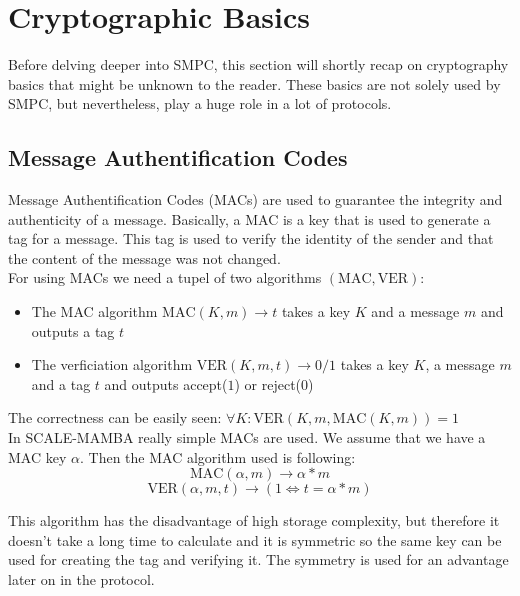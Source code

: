 \documentclass[english,runningheads,a4paper]{llncs}[2018/03/10]
\begin{document}
\section{Cryptographic Basics}\label{sec:basics}

Before delving deeper into SMPC, this section will shortly recap on cryptography basics that might be unknown to the reader. These basics are not solely used by SMPC, but nevertheless, play a huge role in a lot of protocols.

\subsection{Message Authentification Codes}
Message Authentification Codes (MACs) are used to guarantee the integrity and authenticity of a message. Basically, a MAC is a key that is used to generate a tag for a message. This tag is used to verify the identity of the sender and that the content of the message was not changed.\\
For using MACs we need a tupel of two algorithms \((\text{MAC},\text{VER})\):\\
\begin{itemize}
\item The MAC algorithm \(\text{MAC}(K,m)\rightarrow t\) takes a key \(K\) and a message \(m\) and outputs a tag \(t\)\\
\item The verficiation algorithm \(\text{VER}(K,m,t)\rightarrow 0/1\) takes a key \(K\), a message \(m\) and a tag \(t\) and outputs accept(\(1\)) or reject(\(0\))\\
\end{itemize}
The correctness can be easily seen: \(\forall K: \text{VER}(K,m,\text{MAC}(K,m))=1\)\\


In SCALE-MAMBA really simple MACs are used. We assume that we have a MAC key \( \alpha \). Then the MAC algorithm used is following:\\
$$\text{MAC}(\alpha,m)\rightarrow \alpha * m$$ 
$$\text{VER}(\alpha,m,t)\rightarrow (1 \Leftrightarrow t = \alpha*m) $$ 

This algorithm has the disadvantage of high storage complexity, but therefore it doesn't take a long time to calculate and it is symmetric so the same key can be used for creating the tag and verifying it. The symmetry is used for an advantage later on in the protocol.\\
\end{document}
